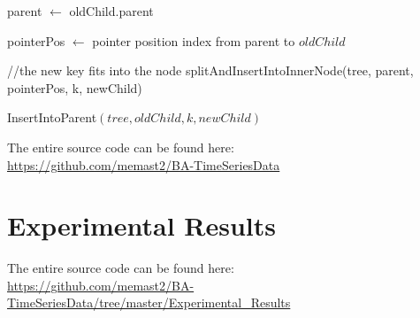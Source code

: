 \documentclass[abstracton,12pt,oneside]{scrreprt}
\begin{document}
\begin{algorithm}[H]
	\IncMargin{1em}
	\SetAlgoLined
	\DontPrintSemicolon
	
	
	
	parent $\leftarrow$ oldChild.parent\;
	
	
	pointerPos $\leftarrow$ pointer position index from parent to $oldChild$\;
	
	//the new key fits into the node\;
	{
		splitAndInsertIntoInnerNode(tree, parent, pointerPos, k, newChild)\;
	}
	
	
	\caption{InsertIntoParent$(tree, oldChild, k, newChild)$}	\label{InsertIntoParent}
\end{algorithm}


\BlankLine
The entire source code can be found here: \\
\url{https://github.com/memast2/BA-TimeSeriesData}


\chapter{Experimental Results}
The entire source code can be found here: \\
\url{https://github.com/memast2/BA-TimeSeriesData/tree/master/Experimental_Results}
\end{document}
